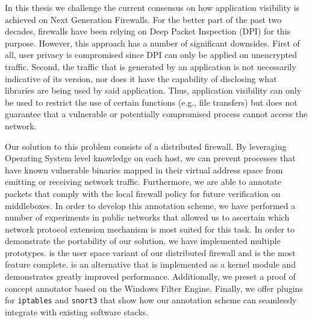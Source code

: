 
In this thesis we challenge the current consensus on how application visibility
is achieved on Next Generation Firewalls. For the better part of the past two
decades, firewalls have been relying on Deep Packet Inspection (DPI) for this purpose.
However, this approach has a number of significant downsides. First of all,
user privacy is compromised since DPI can only be applied on unencrypted traffic.
Second, the traffic that is generated by an application is not necessarily
indicative of its version, nor does it have the capability of disclosing what
libraries are being used by said application. Thus, application visibility can only
be used to restrict the use of certain functions (e.g., file transfers) but does
not guarantee that a vulnerable or potentially compromised process cannot access
the network.

Our solution to this problem consists of a distributed firewall. By leveraging
Operating System level knowledge on each host, we can prevent processes
that have known vulnerable binaries mapped in their virtual address space from
emitting or receiving network traffic. Furthermore, we are able to annotate
packets that comply with the local firewall policy for future verification on
middleboxes. In order to develop this annotation scheme, we have performed
a number of experiments in public networks that allowed us to ascertain which
network protocol extension mechanism is most suited for this task. In order to
demonstrate the portability of our solution, we have implemented multiple
prototypes. \daf{} is the user space variant of our distributed firewall and is
the most feature complete. \scout{} is an alternative that is implemented as
a kernel module and demonstrates greatly improved performance. Additionally, we
preset a proof of concept annotator based on the Windows Filter Engine. Finally,
we offer plugins for \texttt{iptables} and \texttt{snort3} that show how our
annotation scheme can seamlessly integrate with existing software stacks.

